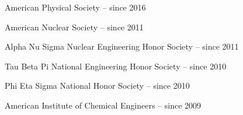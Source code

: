 \begin{list1}
\item[] American Physical Society  \hfill{ -- since 2016}
\item[] American Nuclear Society  \hfill{ -- since 2011}
\item[] Alpha Nu Sigma Nuclear Engineering Honor Society \hfill{-- since 2011}
\item[] Tau Beta Pi National Engineering Honor Society \hfill{-- since 2010}
\item[] Phi Eta Sigma National Honor Society \hfill{-- since 2010}
\item[] American Institute of Chemical Engineers \hfill{-- since 2009}
\end{list1}